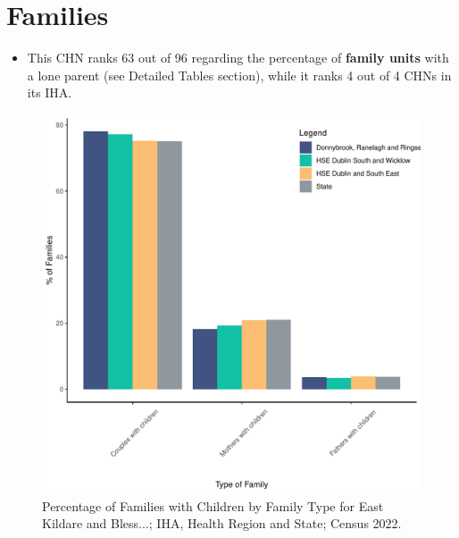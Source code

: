 \documentclass{article}
\begin{document}
\section{Families}\label{sect:Fam}
\begin{itemize}
\item This CHN ranks  63 out of 96 regarding the percentage of \textbf{family units} with a lone parent (see Detailed Tables section), while it ranks   4 out of 4 CHNs in its IHA.
\end{itemize}
\begin{figure}[H]
	\centering
	\includegraphics[width = 150mm]{../figures/FamED.pdf}
	\caption{Percentage of Families with Children by Family Type for East Kildare and Bless...; IHA, Health Region and State; Census 2022.}
	\label{fig:vbnv}
	\end{figure}
	
\end{document}
